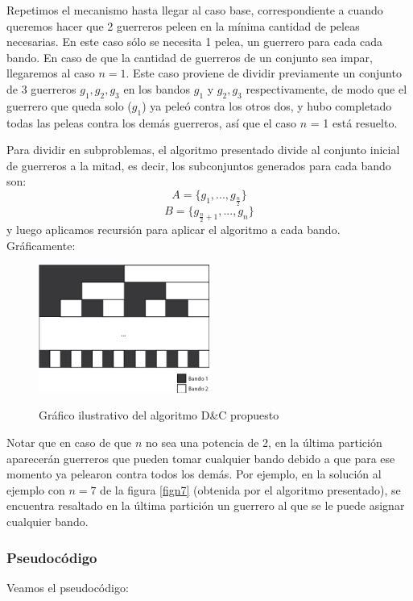 Repetimos el mecanismo hasta llegar al caso base, correspondiente a cuando queremos hacer que 2 guerreros peleen en la mínima cantidad de peleas necesarias. En  este caso sólo se necesita 1 pelea, un guerrero para cada cada bando. En caso de que la cantidad de guerreros de un conjunto sea impar, llegaremos al caso $n=1$. Este caso proviene de dividir previamente un conjunto de 3 guerreros $g_1, g_2, g_3$ en los bandos $g_1$ y  $g_2, g_3$ respectivamente, de modo que el guerrero que queda solo ($g_1$) ya peleó contra los otros dos, y hubo completado todas las peleas contra los demás guerreros, así que el caso $n$ = 1 está resuelto.

Para dividir en subproblemas, el algoritmo presentado divide al conjunto inicial de guerreros a la mitad, es decir, los subconjuntos generados para cada bando son:
\[A = \{g_1,...,g_{\frac{n}{2}}\}\] 
\[B = \{g_{\frac{n}{2}+1},...,g_n\}\]
y luego aplicamos recursión para aplicar el algoritmo a cada bando. Gráficamente:

\begin{figure}[H]
\centering
\includegraphics[width=0.50\textwidth]{img/ejemplos/ej1-6.png}
\label{fig:ej1-6}
\caption{Gráfico ilustrativo del algoritmo D\&C propuesto}
\end{figure}

Notar que en caso de que $n$ no sea una potencia de 2, en la última partición aparecerán guerreros que pueden tomar cualquier bando debido a que para ese momento ya pelearon contra todos los demás. Por ejemplo, en la solución al ejemplo con $n=7$ de la figura \ref{fign7} (obtenida por el algoritmo presentado), se encuentra resaltado en la última partición un guerrero al que se le puede asignar cualquier bando.

\subsubsection{Pseudocódigo}
Veamos el pseudocódigo:

\newpage

